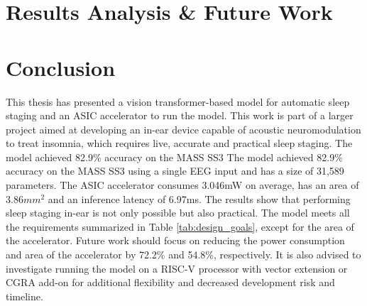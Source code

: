 \documentclass[12pt]{article}
\begin{document}
\newpage
\section{Results Analysis \& Future Work}


\newpage
\section{Conclusion}
\label{ref:conclusion}
This thesis has presented a vision transformer-based model for automatic sleep staging and an ASIC accelerator to run the model. This work is part of a larger project aimed at developing
an in-ear device capable of acoustic neuromodulation to treat insomnia, which requires live, accurate and practical sleep staging. The model achieved 82.9\% accuracy on the MASS SS3
The model achieved 82.9\% accuracy on the MASS SS3 using a single EEG input and has a size of 31,589 parameters. The ASIC accelerator consumes 3.046mW on average, has an area of 3.86$mm^2$
and an inference latency of 6.97ms. The results show that performing sleep staging in-ear is not only possible but also practical. The model meets all the requirements summarized in Table
\ref{tab:design_goals}, except for the area of the accelerator. Future work should focus on reducing the power consumption and area of the accelerator by 72.2\% and 54.8\%, respectively. It is
also advised to investigate running the model on a RISC-V processor with vector extension or CGRA add-on for additional flexibility and decreased development risk and timeline.

\newpage

\AtNextBibliography{\footnotesize}
\printbibliography[heading=bibintoc]
\newpage





\newpage
\end{document}
